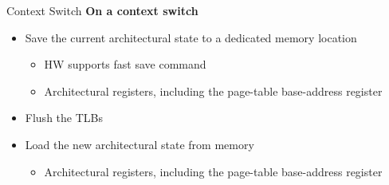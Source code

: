 \documentclass[aspectratio=169,12pt]{beamer}
\begin{document}
\begin{frame}{Context Switch}
\textbf{On a context switch}
\begin{itemize}
\item Save the current architectural state to a dedicated memory location
    \begin{itemize}
    \item HW supports fast save command
    \item Architectural registers, including the page-table base-address register
    \end{itemize}
\item Flush the TLBs
\item Load the new architectural state from memory
    \begin{itemize}
    \item Architectural registers, including the page-table base-address register
    \end{itemize}
\end{itemize}
\end{frame}
\end{document}

